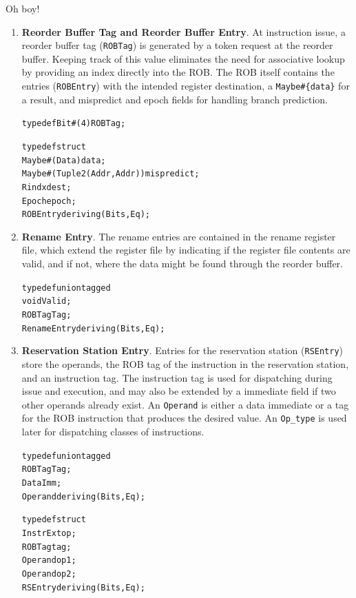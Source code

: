\documentclass[12pt]{article}
\begin{document}
Oh boy!

\begin{enumerate}
    \item \textbf{Reorder Buffer Tag and Reorder Buffer Entry}. At instruction issue, a reorder buffer tag 
    (\verb=ROBTag=) is generated by a token request at the reorder buffer. Keeping track of this value eliminates 
    the need for associative lookup by providing an index directly into the ROB. The ROB itself contains 
    the entries (\verb=ROBEntry=) with the intended register destination, a \verb=Maybe#{data}= for a
    result, and mispredict and epoch fields for handling branch prediction. 
    \begin{alltt}
        typedef Bit#(4) ROBTag;
        
        typedef struct {
            Maybe#(Data) data;
            Maybe#(Tuple2(Addr,Addr)) mispredict;
            Rindx dest;
            Epoch epoch;
        } ROBEntry deriving (Bits, Eq);
    \end{alltt}
    
    \item \textbf{Rename Entry}. The rename entries are contained in the rename register file, which extend 
    the register file by indicating if the register file contents are valid, and if not, where the data 
    might be found through the reorder buffer.
    \begin{alltt}
        typedef union tagged {
            void Valid;
            ROBTag Tag;
        } RenameEntry deriving (Bits, Eq);
    \end{alltt}
    
    \item \textbf{Reservation Station Entry}. Entries for the reservation station (\verb=RSEntry=) store 
    the operands, the ROB tag of the instruction in the reservation station, and an instruction tag. The 
    instruction tag is used for dispatching during issue and execution, and may also be extended by a 
    immediate field if two other operands already exist. An \verb=Operand= is either a data immediate
    or a tag for the ROB instruction that produces the desired value. An \verb=Op_type= is used later
    for dispatching classes of instructions. 
    \begin{alltt}
        typedef union tagged {
            ROBTag Tag;
            Data Imm;
        } Operand deriving (Bits, Eq);
        
        typedef struct {
            InstrExt op;
            ROBTag tag;
            Operand op1;
            Operand op2;
        } RSEntry deriving (Bits, Eq);
        

\end{alltt}
\end{enumerate}
\end{document}
